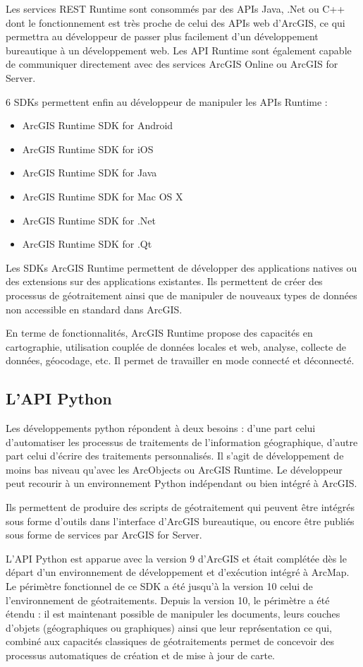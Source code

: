 \documentclass[11pt]{article}
\begin{document}
Les services REST Runtime sont consommés par des APIs Java, .Net ou C++ dont le fonctionnement est très proche de celui des APIs web d'ArcGIS, ce qui permettra au développeur de passer plus facilement d'un développement bureautique à un développement web. Les API Runtime sont également capable de communiquer directement avec des services ArcGIS Online ou ArcGIS for Server.

6 SDKs permettent enfin au développeur de manipuler les APIs Runtime :
\begin{itemize}
	\item ArcGIS Runtime SDK for Android
	\item ArcGIS Runtime SDK for iOS
	\item ArcGIS Runtime SDK for Java
	\item ArcGIS Runtime SDK for Mac OS X
	\item ArcGIS Runtime SDK for .Net
	\item ArcGIS Runtime SDK for .Qt
\end{itemize}

Les SDKs ArcGIS Runtime permettent de développer des applications natives ou des extensions sur des applications existantes. Ils permettent de créer des processus de géotraitement ainsi que de manipuler de nouveaux types de données non accessible en standard dans ArcGIS.

En terme de fonctionnalités, ArcGIS Runtime propose des capacités en cartographie, utilisation couplée de données locales et web, analyse, collecte de données, géocodage,  etc. Il permet de travailler en mode connecté et déconnecté.


\subsection{L'API Python}
Les développements python répondent à deux besoins : d'une part celui d'automatiser les processus de traitements de l'information géographique, d'autre part celui d'écrire des traitements personnalisés. Il s'agit de développement de moins bas niveau qu'avec les ArcObjects ou ArcGIS Runtime. Le développeur peut recourir à un environnement Python indépendant ou bien intégré à ArcGIS.

Ils permettent de produire des scripts de géotraitement qui peuvent être intégrés sous forme d'outils dans l'interface d'ArcGIS bureautique, ou encore être publiés sous forme de services par ArcGIS for Server.

L'API Python est apparue avec la version 9 d'ArcGIS et était complétée dès le départ d'un environnement de développement et d'exécution intégré à ArcMap. Le périmètre fonctionnel de ce SDK a été jusqu'à la version 10 celui de l'environnement de géotraitements. Depuis la version 10, le périmètre a été étendu : il est maintenant possible de manipuler les documents, leurs couches d'objets (géographiques ou graphiques) ainsi que leur représentation ce qui, combiné aux capacités classiques de géotraitements permet de concevoir des processus automatiques de création et de mise à jour de carte. 
\end{document}
